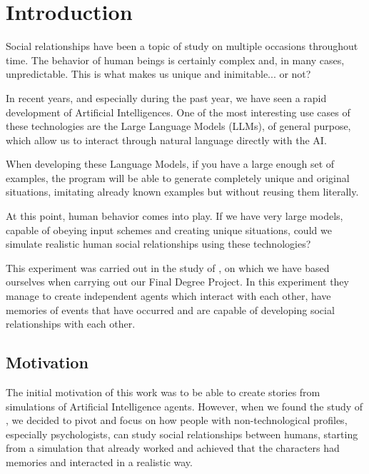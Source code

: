 \chapter*{Introduction}
\label{cap:introduction}


Social relationships have been a topic of study on multiple occasions throughout time. The behavior of human beings is certainly complex and, in many cases, unpredictable. This is what makes us unique and inimitable... or not?

In recent years, and especially during the past year, we have seen a rapid development of Artificial Intelligences. One of the most interesting use cases of these technologies are the Large Language Models (LLMs), of general purpose, which allow us to interact through natural language directly with the AI.

When developing these Language Models, if you have a large enough set of examples, the program will be able to generate completely unique and original situations, imitating already known examples but without reusing them literally.

At this point, human behavior comes into play. If we have very large models, capable of obeying input schemes and creating unique situations, could we simulate realistic human social relationships using these technologies?

This experiment was carried out in the study of \cite{park2023generative}, on which we have based ourselves when carrying out our Final Degree Project. In this experiment they manage to create independent agents which interact with each other, have memories of events that have occurred and are capable of developing social relationships with each other.

\section*{Motivation}

The initial motivation of this work was to be able to create stories from simulations of Artificial Intelligence agents. However, when we found the study of \ga, we decided to pivot and focus on how people with non-technological profiles, especially psychologists, can study social relationships between humans, starting from a simulation that already worked and achieved that the characters had memories and interacted in a realistic way.

